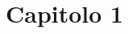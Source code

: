 \newpage
\clearpage{\pagestyle{empty}\cleardoublepage}
\chapter{Capitolo 1}
\label{intro}
\thispagestyle{plain}
\renewcommand{\labelenumi}{\theenumi.}

